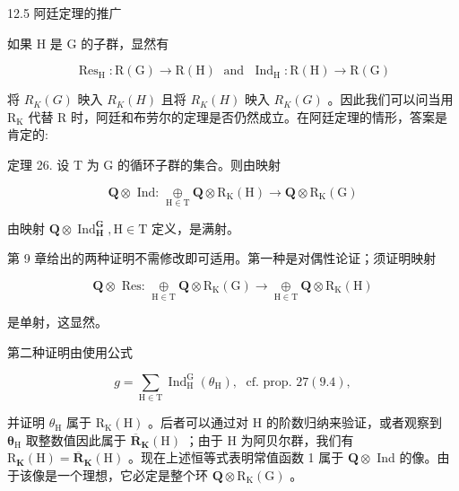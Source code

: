 \documentclass[10pt]{article}
\begin{document}
12.5 阿廷定理的推广

如果 \(\mathrm{H}\) 是 \(\mathrm{G}\) 的子群，显然有

\[
{\operatorname{Res}}_{\mathrm{H}} : \mathrm{R}\left( \mathrm{G}\right)  \rightarrow  \mathrm{R}\left( \mathrm{H}\right) \;\text{ and }\;{\operatorname{Ind}}_{\mathrm{H}} : \mathrm{R}\left( \mathrm{H}\right)  \rightarrow  \mathrm{R}\left( \mathrm{G}\right)
\]

将 \({R}_{K}\left( G\right)\) 映入 \({R}_{K}\left( H\right)\) 且将 \({R}_{K}\left( H\right)\) 映入 \({R}_{K}\left( G\right)\) 。因此我们可以问当用 \({\mathrm{R}}_{\mathrm{K}}\) 代替 \(\mathrm{R}\) 时，阿廷和布劳尔的定理是否仍然成立。在阿廷定理的情形，答案是肯定的:

定理 26. 设 T 为 G 的循环子群的集合。则由映射

\[
\mathbf{Q} \otimes  \text{ Ind: }\underset{\mathrm{H} \in  \mathrm{T}}{ \oplus  }\mathbf{Q} \otimes  {\mathrm{R}}_{\mathrm{K}}\left( \mathrm{H}\right)  \rightarrow  \mathbf{Q} \otimes  {\mathrm{R}}_{\mathrm{K}}\left( \mathrm{G}\right)
\]

由映射 \(\mathbf{Q} \otimes  {\operatorname{Ind}}_{\mathbf{H}}^{\mathbf{G}},\mathrm{H} \in  \mathrm{T}\) 定义，是满射。

第 9 章给出的两种证明不需修改即可适用。第一种是对偶性论证；须证明映射

\[
\mathbf{Q} \otimes  \text{ Res: }\underset{\mathrm{H} \in  \mathrm{T}}{ \oplus  }\mathbf{Q} \otimes  {\mathrm{R}}_{\mathrm{K}}\left( \mathrm{G}\right)  \rightarrow  \underset{\mathrm{H} \in  \mathrm{T}}{ \oplus  }\mathbf{Q} \otimes  {\mathrm{R}}_{\mathrm{K}}\left( \mathrm{H}\right)
\]

是单射，这显然。

第二种证明由使用公式

\[
g = \mathop{\sum }\limits_{{\mathrm{H} \in  \mathrm{T}}}{\operatorname{Ind}}_{\mathrm{H}}^{\mathrm{G}}\left( {\theta }_{\mathrm{H}}\right) ,\;\text{ cf. prop. }{27}\left( {9.4}\right) ,
\]

并证明 \({\theta }_{\mathrm{H}}\) 属于 \({\mathrm{R}}_{\mathrm{K}}\left( \mathrm{H}\right)\) 。后者可以通过对 \(\mathrm{H}\) 的阶数归纳来验证，或者观察到 \({\mathbf{\theta }}_{\mathrm{H}}\) 取整数值因此属于 \({\overline{\mathbf{R}}}_{\mathbf{K}}\left( \mathrm{H}\right)\) ；由于 \(\mathrm{H}\) 为阿贝尔群，我们有 \({\mathrm{R}}_{\mathbf{K}}\left( \mathrm{H}\right)  = {\overline{\mathbf{R}}}_{\mathbf{K}}\left( \mathrm{H}\right)\) 。现在上述恒等式表明常值函数 1 属于 \(\mathbf{Q} \otimes\) Ind 的像。由于该像是一个理想，它必定是整个环 \(\mathbf{Q} \otimes  {\mathrm{R}}_{\mathrm{K}}\left( \mathrm{G}\right)\) 。
\end{document}
